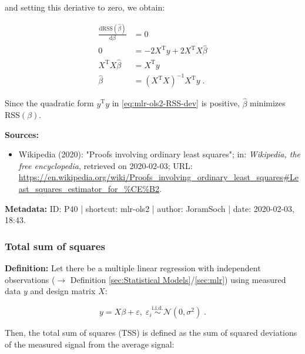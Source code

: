 \documentclass[a4paper,12pt,twoside]{book}
\begin{document}
and setting this deriative to zero, we obtain:

\begin{equation} \label{eq:mlr-ols2-OLS-qed}
\begin{split}
\frac{\mathrm{d}\mathrm{RSS}(\hat{\beta})}{\mathrm{d}\beta} &= 0 \\
0 &= - 2 X^\mathrm{T} y + 2 X^\mathrm{T} X \hat{\beta} \\
X^\mathrm{T} X \hat{\beta} &= X^\mathrm{T} y \\
\hat{\beta} &= (X^\mathrm{T} X)^{-1} X^\mathrm{T} y \; .
\end{split}
\end{equation}

Since the quadratic form $y^\mathrm{T} y$ in \eqref{eq:mlr-ols2-RSS-dev} is positive, $\hat{\beta}$ minimizes $\mathrm{RSS}(\beta)$.


\vspace{1em}
\textbf{Sources:}
\begin{itemize}
\item Wikipedia (2020): "Proofs involving ordinary least squares"; in: \textit{Wikipedia, the free encyclopedia}, retrieved on 2020-02-03; URL: \url{https://en.wikipedia.org/wiki/Proofs_involving_ordinary_least_squares#Least_squares_estimator_for_%CE%B2}.
\end{itemize}


\vspace{1em}
\textbf{Metadata:} ID: P40 | shortcut: mlr-ols2 | author: JoramSoch | date: 2020-02-03, 18:43.
\vspace{1em}



\subsubsection[\textit{Total sum of squares}]{Total sum of squares} \label{sec:tss}
\setcounter{equation}{0}

\textbf{Definition:} Let there be a multiple linear regression with independent observations ($\rightarrow$ Definition \ref{sec:Statistical Models}/\ref{sec:mlr}) using measured data $y$ and design matrix $X$:

\begin{equation} \label{eq:tss-mlr}
y = X\beta + \varepsilon, \; \varepsilon_i \overset{\mathrm{i.i.d.}}{\sim} \mathcal{N}(0, \sigma^2) \; .
\end{equation}

Then, the total sum of squares (TSS) is defined as the sum of squared deviations of the measured signal from the average signal:
\end{document}
